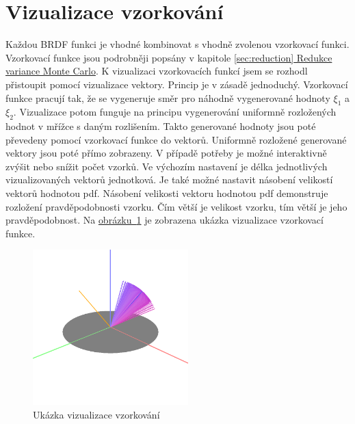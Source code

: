 \documentclass[czech,master]{diploma}
\newcommand{\randU}{\xi_{1}}
\newcommand{\randV}{\xi_{2}}
\begin{document}
\section{Vizualizace vzorkování}
Každou BRDF funkci je vhodné kombinovat s vhodně zvolenou vzorkovací funkci. Vzorkovací funkce jsou podrobněji popsány v kapitole \hyperref[sec:reduction]{\ref{sec:reduction} Redukce variance Monte Carlo}. K vizualizaci vzorkovacích funkcí jsem se rozhodl přistoupit pomocí vizualizace vektory. Princip je v zásadě jednoduchý. Vzorkovací funkce pracují tak, že se vygeneruje směr pro náhodně vygenerované hodnoty \(\randU\) a \(\randV\). Vizualizace potom funguje na principu vygenerování uniformně rozložených hodnot v mřížce s daným rozlišením. Takto generované hodnoty jsou poté převedeny pomocí vzorkovací funkce do vektorů. Uniformně rozložené generované vektory jsou poté přímo zobrazeny. V případě potřeby je možné interaktivně zvýšit nebo snížit počet vzorků. Ve výchozím nastavení je délka jednotlivých vizualizovaných vektorů jednotková. Je také možné nastavit násobení velikostí vektorů hodnotou pdf. Násobení velikosti vektoru hodnotou pdf demonstruje rozložení pravděpodobnosti vzorku. Čím větší je velikost vzorku, tím větší je jeho pravděpodobnost. Na \hyperref[fig:samplingExample]{obrázku~\ref{fig:samplingExample}} je zobrazena ukázka vizualizace vzorkovací funkce.

\begin{figure}
  \centering
  \includegraphics[width=6cm]{Figures/samplingExample.png}
  \caption{Ukázka vizualizace vzorkování}%
  \label{fig:samplingExample}%
\end{figure}
\end{document}
